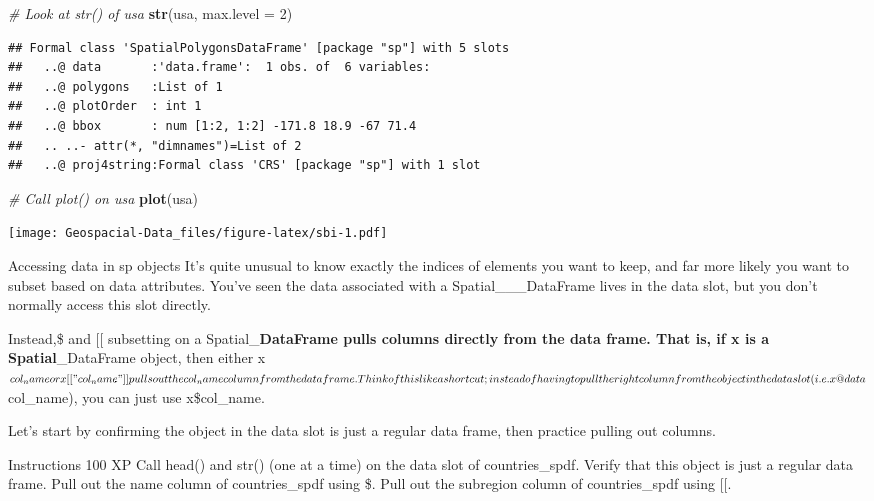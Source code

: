 \documentclass[]{article}
\newenvironment{Shaded}{\begin{snugshade}}{\end{snugshade}}
\newcommand{\CommentTok}[1]{\textcolor[rgb]{0.56,0.35,0.01}{\textit{#1}}}
\newcommand{\DataTypeTok}[1]{\textcolor[rgb]{0.13,0.29,0.53}{#1}}
\newcommand{\DecValTok}[1]{\textcolor[rgb]{0.00,0.00,0.81}{#1}}
\newcommand{\KeywordTok}[1]{\textcolor[rgb]{0.13,0.29,0.53}{\textbf{#1}}}
\newcommand{\NormalTok}[1]{#1}
\begin{document}
\begin{Shaded}
\begin{Highlighting}[]
\CommentTok{# Look at str() of usa}
\KeywordTok{str}\NormalTok{(usa, }\DataTypeTok{max.level =} \DecValTok{2}\NormalTok{)}
\end{Highlighting}
\end{Shaded}

\begin{verbatim}
## Formal class 'SpatialPolygonsDataFrame' [package "sp"] with 5 slots
##   ..@ data       :'data.frame':  1 obs. of  6 variables:
##   ..@ polygons   :List of 1
##   ..@ plotOrder  : int 1
##   ..@ bbox       : num [1:2, 1:2] -171.8 18.9 -67 71.4
##   .. ..- attr(*, "dimnames")=List of 2
##   ..@ proj4string:Formal class 'CRS' [package "sp"] with 1 slot
\end{verbatim}

\begin{Shaded}
\begin{Highlighting}[]
\CommentTok{# Call plot() on usa}
\KeywordTok{plot}\NormalTok{(usa)}
\end{Highlighting}
\end{Shaded}

\texttt{[image: Geospacial-Data\_files/figure-latex/sbi-1.pdf]}

Accessing data in sp objects It's quite unusual to know exactly the
indices of elements you want to keep, and far more likely you want to
subset based on data attributes. You've seen the data associated with a
Spatial\_\_\_DataFrame lives in the data slot, but you don't normally
access this slot directly.

Instead,\$ and {[}{[} subsetting on a Spatial\_\textbf{DataFrame pulls
columns directly from the data frame. That is, if x is a
Spatial}\_DataFrame object, then either
x\(col_name or x[["col_name"]] pulls out the col_name column from the data frame. Think of this like a shortcut; instead of having to pull the right column from the object in the data slot (i.e. x@data\)col\_name),
you can just use x\$col\_name.

Let's start by confirming the object in the data slot is just a regular
data frame, then practice pulling out columns.

Instructions 100 XP Call head() and str() (one at a time) on the data
slot of countries\_spdf. Verify that this object is just a regular data
frame. Pull out the name column of countries\_spdf using \$. Pull out
the subregion column of countries\_spdf using {[}{[}.
\end{document}
